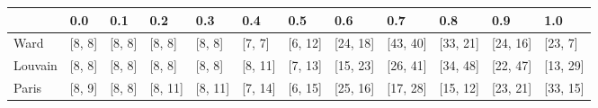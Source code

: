 \begin{tabular}{llllllllllll}
\toprule
{} &     0.0 &     0.1 &      0.2 &      0.3 &      0.4 &      0.5 &       0.6 &       0.7 &       0.8 &       0.9 &       1.0 \\
\midrule
Ward    &  [8, 8] &  [8, 8] &   [8, 8] &   [8, 8] &   [7, 7] &  [6, 12] &  [24, 18] &  [43, 40] &  [33, 21] &  [24, 16] &   [23, 7] \\
Louvain &  [8, 8] &  [8, 8] &   [8, 8] &   [8, 8] &  [8, 11] &  [7, 13] &  [15, 23] &  [26, 41] &  [34, 48] &  [22, 47] &  [13, 29] \\
Paris   &  [8, 9] &  [8, 8] &  [8, 11] &  [8, 11] &  [7, 14] &  [6, 15] &  [25, 16] &  [17, 28] &  [15, 12] &  [23, 21] &  [33, 15] \\
\bottomrule
\end{tabular}
